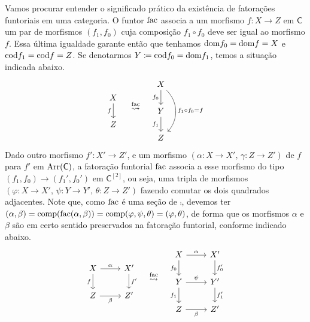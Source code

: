 Vamos procurar entender o significado prático da existência de fatorações funtoriais em uma categoria.
O funtor $\mathrm{fac}$ associa a um morfismo $f: X \to Z$ em $\mathsf{C}$ um par de morfismos $(f_{1},f_{0})$ cuja composição $f_{1} \circ f_{0}$ deve ser igual ao morfismo $f$.
Essa última igualdade garante então que tenhamos $\mathrm{dom} f_{0} = \mathrm{dom} f = X$ e $\mathrm{cod} f_{1} = \mathrm{cod} f = Z$.
Se denotarmos $Y \coloneqq \mathrm{cod} f_{0} = \mathrm{dom} f_{1}$, temos a situação indicada abaixo.
\begin{displaymath}
  \begin{tikzcd}
    X
    \arrow[d, "f" swap]
    \\ Z
  \end{tikzcd}
  \quad \overset{\fac}{\rightsquigarrow} \quad
  \begin{tikzcd}
    X
    \arrow[d, "f_{0}" swap]
    \arrow[dd, bend left=45, "f_{1} \circ f_{0} = f"]
    \\ Y
    \arrow[d, "f_{1}" swap]
    \\ Z
  \end{tikzcd}
\end{displaymath}
Dado outro morfismo $f': X' \to Z'$, e um morfismo $(\alpha: X \to X',\, \gamma: Z \to Z')$ de $f$ para $f'$ em $\mathrm{Arr}(\mathsf{C})$, a fatoração funtorial $\mathrm{fac}$ associa a esse morfismo do tipo $(f_{1},f_{0}) \to (f_{1}',f_{0}')$ em $\mathsf{C}^{[2]}$, ou seja, uma tripla de morfismos $(\varphi: X \to X',\, \psi: Y \to Y',\, \theta: Z \to Z')$ fazendo comutar os dois quadrados adjacentes.
Note que, como $\mathrm{fac}$ é uma seção de $\comp$, devemos ter $(\alpha,\beta) = \mathrm{comp}(\mathrm{fac}(\alpha,\beta)) = \mathrm{comp}(\varphi,\psi,\theta) = (\varphi,\theta)$, de forma que os morfismos $\alpha$ e $\beta$ são em certo sentido preservados na fatoração funtorial, conforme indicado abaixo.
\begin{displaymath}
  \begin{tikzcd}
    X
    \arrow[d, "f" swap]
    \arrow[r, "\alpha"]
    & X'
    \arrow[d, "f'"]
    \\ Z
    \arrow[r, "\beta" swap]
    & Z'
  \end{tikzcd}
  \quad \overset{\fac}{\rightsquigarrow} \quad
  \begin{tikzcd}
    X
    \arrow[r, "\alpha"]
    \arrow[d, "f_{0}" swap]
    & X'
    \arrow[d, "f_{0}'"]
    \\ Y
    \arrow[d, "f_{1}" swap]
    \arrow[r, "\psi"]
    & Y'
    \arrow[d, "f_{1}'"]
    \\ Z
    \arrow[r, "\beta" swap]
    & Z'
  \end{tikzcd}
\end{displaymath}

